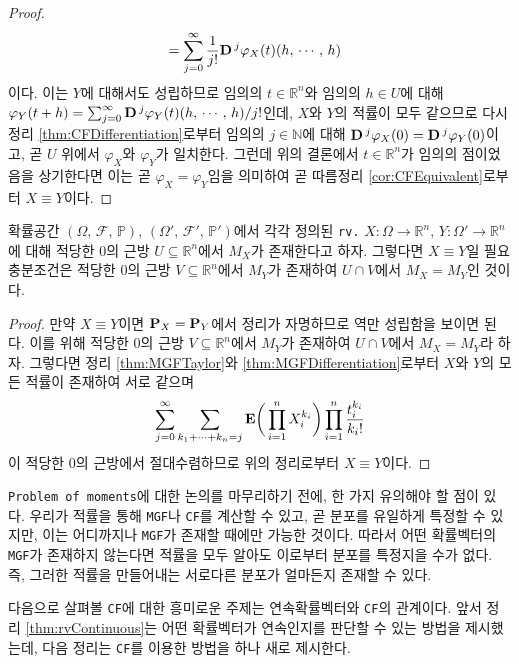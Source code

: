 \begin{proof}
\begin{align*}
        &=\sum_{j=0}^\infty\frac{1}{j!}\mathbf{D}\,^j\varphi_X(t)(h,\,\cdots,\,h)
    \end{align*}
    이다. 이는 $Y$에 대해서도 성립하므로 임의의 $t\in\mathbb{R}^n$와 임의의 $h\in U$에 대해 $\varphi_Y(t+h)=\sum_{j=0}^\infty\mathbf{D}\,^j\varphi_Y(t)(h,\,\cdots,\,h)/j!$인데, $X$와 $Y$의 적률이 모두 같으므로 다시 정리 \ref{thm:CFDifferentiation}로부터 임의의 $j\in\mathbb{N}$에 대해 $\mathbf{D}\,^j\varphi_X(0)=\mathbf{D}\,^j\varphi_Y(0)$이고, 곧 $U$ 위에서 $\varphi_X$와 $\varphi_Y$가 일치한다. 그런데 위의 결론에서 $t\in\mathbb{R}^n$가 임의의 점이었음을 상기한다면 이는 곧 $\varphi_X=\varphi_Y$임을 의미하여 곧 따름정리 \ref{cor:CFEquivalent}로부터 $X\equiv Y$이다.
\end{proof}

\begin{corollary}
    확률공간 $(\Omega,\,\mathcal{F},\,\mathbb{P}),\,(\Omega',\,\mathcal{F}',\,\mathbb{P}')$에서 각각 정의된 \texttt{rv.} $X:\Omega\to\mathbb{R}^n,\,Y:\Omega'\to\mathbb{R}^n$에 대해 적당한 $0$의 근방 $U\subseteq\mathbb{R}^n$에서 $M_X$가 존재한다고 하자. 그렇다면 $X\equiv Y$일 필요충분조건은 적당한 $0$의 근방 $V\subseteq\mathbb{R}^n$에서 $M_Y$가 존재하여 $U\cap V$에서 $M_X=M_Y$인 것이다.
\end{corollary}

\begin{proof}
    만약 $X\equiv Y$이면 $\mathbf{P}_X=\mathbf{P}_Y$에서 정리가 자명하므로 역만 성립함을 보이면 된다. 이를 위해 적당한 $0$의 근방 $V\subseteq\mathbb{R}^n$에서 $M_Y$가 존재하여 $U\cap V$에서 $M_X=M_Y$라 하자. 그렇다면 정리 \ref{thm:MGFTaylor}와 \ref{thm:MGFDifferentiation}로부터 $X$와 $Y$의 모든 적률이 존재하여 서로 같으며
    \begin{equation*}
        \sum_{j=0}^\infty\sum_{k_1+\cdots+k_n=j}\mathbf{E}\bigg(\prod_{i=1}^nX_i^{k_i}\bigg)\prod_{i=1}^n\frac{t_i^{k_i}}{k_i!}
    \end{equation*}
    이 적당한 $0$의 근방에서 절대수렴하므로 위의 정리로부터 $X\equiv Y$이다.
\end{proof}

\texttt{Problem of moments}에 대한 논의를 마무리하기 전에, 한 가지 유의해야 할 점이 있다. 우리가 적률을 통해 \texttt{MGF}나 \texttt{CF}를 계산할 수 있고, 곧 분포를 유일하게 특정할 수 있지만, 이는 어디까지나 \texttt{MGF}가 존재할 때에만 가능한 것이다. 따라서 어떤 확률벡터의 \texttt{MGF}가 존재하지 않는다면 적률을 모두 알아도 이로부터 분포를 특정지을 수가 없다. 즉, 그러한 적률을 만들어내는 서로다른 분포가 얼마든지 존재할 수 있다.

다음으로 살펴볼 \texttt{CF}에 대한 흥미로운 주제는 연속확률벡터와 \texttt{CF}의 관계이다. 앞서 정리 \ref{thm:rvContinuous}는 어떤 확률벡터가 연속인지를 판단할 수 있는 방법을 제시했는데, 다음 정리는 \texttt{CF}를 이용한 방법을 하나 새로 제시한다.

